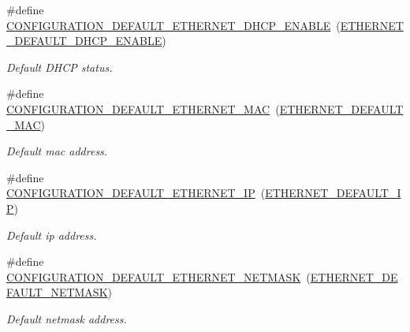 \begin{DoxyCompactItemize}
\mbox{\label{rmap-config_8h_aedfe334cb469b9ad487a0ba637d29662}} 
\#define \hyperlink{rmap-config_8h_aedfe334cb469b9ad487a0ba637d29662}{C\+O\+N\+F\+I\+G\+U\+R\+A\+T\+I\+O\+N\+\_\+\+D\+E\+F\+A\+U\+L\+T\+\_\+\+E\+T\+H\+E\+R\+N\+E\+T\+\_\+\+D\+H\+C\+P\+\_\+\+E\+N\+A\+B\+LE}~(\hyperlink{ethernet__config_8h_a6d72f280384bb90ffd7c78bb188dd6ad}{E\+T\+H\+E\+R\+N\+E\+T\+\_\+\+D\+E\+F\+A\+U\+L\+T\+\_\+\+D\+H\+C\+P\+\_\+\+E\+N\+A\+B\+LE})
\begin{DoxyCompactList}\small\item\em Default D\+H\+CP status. \end{DoxyCompactList}\item 
\mbox{\label{rmap-config_8h_a5333d2c3bcda84cc19a56f3ab7a2bcce}} 
\#define \hyperlink{rmap-config_8h_a5333d2c3bcda84cc19a56f3ab7a2bcce}{C\+O\+N\+F\+I\+G\+U\+R\+A\+T\+I\+O\+N\+\_\+\+D\+E\+F\+A\+U\+L\+T\+\_\+\+E\+T\+H\+E\+R\+N\+E\+T\+\_\+\+M\+AC}~(\hyperlink{ethernet__config_8h_aec01256edf75fe9fc49e47cd1e5954f6}{E\+T\+H\+E\+R\+N\+E\+T\+\_\+\+D\+E\+F\+A\+U\+L\+T\+\_\+\+M\+AC})
\begin{DoxyCompactList}\small\item\em Default mac address. \end{DoxyCompactList}\item 
\mbox{\label{rmap-config_8h_ae03d41374839792a8b5585ebf9bdcd3b}} 
\#define \hyperlink{rmap-config_8h_ae03d41374839792a8b5585ebf9bdcd3b}{C\+O\+N\+F\+I\+G\+U\+R\+A\+T\+I\+O\+N\+\_\+\+D\+E\+F\+A\+U\+L\+T\+\_\+\+E\+T\+H\+E\+R\+N\+E\+T\+\_\+\+IP}~(\hyperlink{ethernet__config_8h_a708f80b356d050b3caada102553a6fb6}{E\+T\+H\+E\+R\+N\+E\+T\+\_\+\+D\+E\+F\+A\+U\+L\+T\+\_\+\+IP})
\begin{DoxyCompactList}\small\item\em Default ip address. \end{DoxyCompactList}\item 
\mbox{\label{rmap-config_8h_a6e0029e4ba852ab74d69263d934c7160}} 
\#define \hyperlink{rmap-config_8h_a6e0029e4ba852ab74d69263d934c7160}{C\+O\+N\+F\+I\+G\+U\+R\+A\+T\+I\+O\+N\+\_\+\+D\+E\+F\+A\+U\+L\+T\+\_\+\+E\+T\+H\+E\+R\+N\+E\+T\+\_\+\+N\+E\+T\+M\+A\+SK}~(\hyperlink{ethernet__config_8h_a549e67e6695e819967dde18ea96f106d}{E\+T\+H\+E\+R\+N\+E\+T\+\_\+\+D\+E\+F\+A\+U\+L\+T\+\_\+\+N\+E\+T\+M\+A\+SK})
\begin{DoxyCompactList}\small\item\em Default netmask address. \end{DoxyCompactList}\item 

\end{DoxyCompactItemize}
